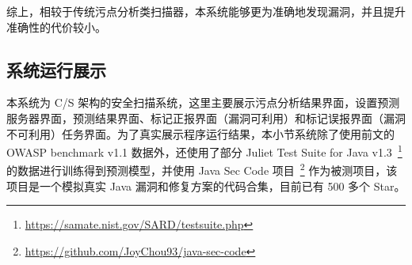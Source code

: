 综上，相较于传统污点分析类扫描器，本系统能够更为准确地发现漏洞，并且提升准确性的代价较小。


%
%
%

\subsection{系统运行展示}

本系统为 C/S 架构的安全扫描系统，这里主要展示污点分析结果界面，设置预测服务器界面，预测结果界面、标记正报界面（漏洞可利用）和标记误报界面（漏洞不可利用）任务界面。为了真实展示程序运行结果，本小节系统除了使用前文的 OWASP benchmark v1.1 数据外，还使用了部分 Juliet Test Suite for Java v1.3~\footnote{\url{https://samate.nist.gov/SARD/testsuite.php}} 的数据进行训练得到预测模型，并使用 Java Sec Code 项目~\footnote{\url{https://github.com/JoyChou93/java-sec-code}} 作为被测项目，该项目是一个模拟真实 Java 漏洞和修复方案的代码合集，目前已有 500 多个 Star。

